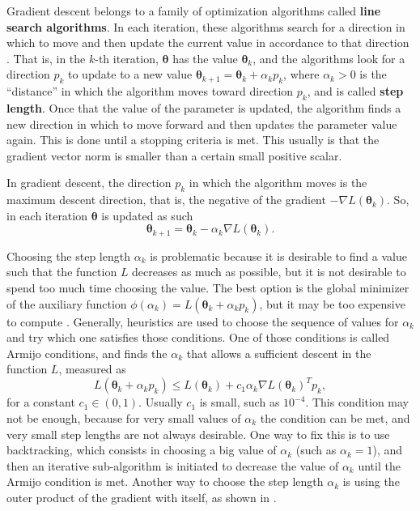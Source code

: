Gradient descent belongs to a family of optimization algorithms called \textbf{line search algorithms}. In each iteration, these algorithms search for a direction in which to move and then update the current value in accordance to that direction \cite[p.~19]{nocedal2006numerical}. That is, in the $k$-th iteration, $\boldsymbol{\theta}$ has the value $\boldsymbol{\theta}_k$, and the algorithms look for a direction $p_k$ to update to a new value $\boldsymbol{\theta}_{k+1} = \boldsymbol{\theta}_k + \alpha_k p_k$, where $\alpha_k > 0$ is the ``distance'' in which the algorithm moves toward direction $p_k$, and is called \textbf{step length}. Once that the value of the parameter is updated, the algorithm finds a new direction in which to move forward and then updates the parameter value again. This is done until a stopping criteria is met. This usually is that the gradient vector norm is smaller than a certain small positive scalar.

In gradient descent, the direction $p_k$ in which the algorithm moves is the maximum descent direction, that is, the negative of the gradient $-\nabla L(\boldsymbol{\theta}_k)$. So, in each iteration $\boldsymbol{\theta}$ is updated as such
\begin{equation}
  \label{eq:parameter_update_gd}
  \boldsymbol{\theta}_{k+1} = \boldsymbol{\theta}_k - \alpha_k \nabla L(\boldsymbol{\theta}_k).
\end{equation}

Choosing the step length $\alpha_k$ is problematic because it is desirable to find a value such that the function $L$ decreases as much as possible, but it is not desirable to spend too much time choosing the value. The best option is the global minimizer of the auxiliary function $\phi(\alpha_k) = L(\boldsymbol{\theta}_k + \alpha_k p_k)$, but it may be too expensive to compute \cite[p.~31]{nocedal2006numerical}. Generally, heuristics are used to choose the sequence of values for $\alpha_k$ and try which one satisfies those conditions. One of those conditions is called Armijo conditions, and finds the $\alpha_k$ that allows a sufficient descent in the function $L$, measured as
\begin{equation}
    L(\boldsymbol{\theta}_k + \alpha_k p_k) \leq L(\boldsymbol{\theta}_k) + c_1 \alpha_k \nabla L(\boldsymbol{\theta}_k)^T p_k,
\end{equation}
for a constant $c_1 \in (0, 1)$. Usually $c_1$ is small, such as $10^{-4}$. This condition may not be enough, because for very small values of $\alpha_k$ the condition can be met, and very small step lengths are not always desirable. One way to fix this is to use backtracking, which consists in choosing a big value of $\alpha_k$ (such as $\alpha_k = 1$), and then an iterative sub-algorithm is initiated to decrease the value of $\alpha_k$ until the Armijo condition is met. Another way to choose the step length $\alpha_k$ is using the outer product of the gradient with itself, as shown in \cite{duchi2011adaptive}.

